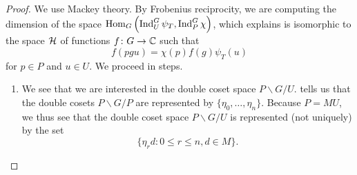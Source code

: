 \begin{proof}
	We use Mackey theory. By Frobenius reciprocity, we are computing the dimension of the space $\operatorname{Hom}_G\left(\operatorname{Ind}_U^G\psi_T,\operatorname{Ind}_P^G\chi\right)$, which \cite[Theorem~32.1]{bump-lie-group} explains is isomorphic to the space $\mathcal{H}$ of functions $f\colon G\to\mathbb C$ such that
    \[f(pgu)=\chi(p)f(g)\psi_T(u)\]
    for $p\in P$ and $u\in U$.
	We proceed in steps.
	\begin{enumerate}
		\item We see that we are interested in the double coset space $P\backslash G/U$.  tells us that the double cosets $P\backslash G/P$ are represented by $\{\eta_0,\ldots,\eta_n\}$. Because $P=MU$, we thus see that the double coset space $P\backslash G/U$ is represented (not uniquely) by the set
        \[\{\eta_rd:0\le r\le n,d\in M\}.\]

\end{enumerate}
\end{proof}
